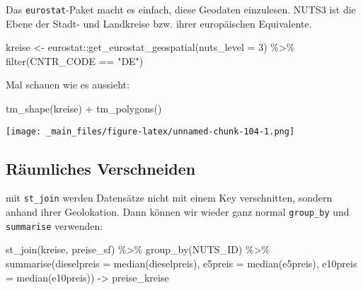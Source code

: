 \documentclass[11pt,german,a4paper]{article}
\newenvironment{Shaded}{\begin{snugshade}}{\end{snugshade}}
\newcommand{\AttributeTok}[1]{\textcolor[rgb]{0.77,0.63,0.00}{#1}}
\newcommand{\DecValTok}[1]{\textcolor[rgb]{0.00,0.00,0.81}{#1}}
\newcommand{\FunctionTok}[1]{\textcolor[rgb]{0.00,0.00,0.00}{#1}}
\newcommand{\NormalTok}[1]{#1}
\newcommand{\OtherTok}[1]{\textcolor[rgb]{0.56,0.35,0.01}{#1}}
\newcommand{\SpecialCharTok}[1]{\textcolor[rgb]{0.00,0.00,0.00}{#1}}
\newcommand{\StringTok}[1]{\textcolor[rgb]{0.31,0.60,0.02}{#1}}
\begin{document}
Das \texttt{eurostat}-Paket macht es einfach, diese Geodaten einzulesen. NUTS3 ist die Ebene der Stadt- und Landkreise bzw. ihrer europäischen Equivalente.

\begin{Shaded}
\begin{Highlighting}[]
\NormalTok{kreise }\OtherTok{\textless{}{-}}\NormalTok{ eurostat}\SpecialCharTok{::}\FunctionTok{get\_eurostat\_geospatial}\NormalTok{(}\AttributeTok{nuts\_level =} \DecValTok{3}\NormalTok{) }\SpecialCharTok{\%\textgreater{}\%}
  \FunctionTok{filter}\NormalTok{(CNTR\_CODE }\SpecialCharTok{==} \StringTok{"DE"}\NormalTok{)}
\end{Highlighting}
\end{Shaded}

Mal schauen wie es aussieht:

\begin{Shaded}
\begin{Highlighting}[]
\FunctionTok{tm\_shape}\NormalTok{(kreise) }\SpecialCharTok{+}
  \FunctionTok{tm\_polygons}\NormalTok{()}
\end{Highlighting}
\end{Shaded}

\texttt{[image: \_main\_files/figure-latex/unnamed-chunk-104-1.png]}

\hypertarget{ruxe4umliches-verschneiden}{%
\subsection{Räumliches Verschneiden}\label{ruxe4umliches-verschneiden}}

mit \texttt{st\_join} werden Datensätze nicht mit einem Key verschnitten, sondern anhand ihrer Geolokation. Dann können wir wieder ganz normal \texttt{group\_by} und \texttt{summarise} verwenden:

\begin{Shaded}
\begin{Highlighting}[]
\FunctionTok{st\_join}\NormalTok{(kreise, preise\_sf) }\SpecialCharTok{\%\textgreater{}\%}
  \FunctionTok{group\_by}\NormalTok{(NUTS\_ID) }\SpecialCharTok{\%\textgreater{}\%}
  \FunctionTok{summarise}\NormalTok{(}\AttributeTok{dieselpreis =} \FunctionTok{median}\NormalTok{(dieselpreis),}
            \AttributeTok{e5preis     =} \FunctionTok{median}\NormalTok{(e5preis),}
            \AttributeTok{e10preis    =} \FunctionTok{median}\NormalTok{(e10preis)) }\OtherTok{{-}\textgreater{}}\NormalTok{ preise\_kreise}
\end{Highlighting}
\end{Shaded}
\end{document}
